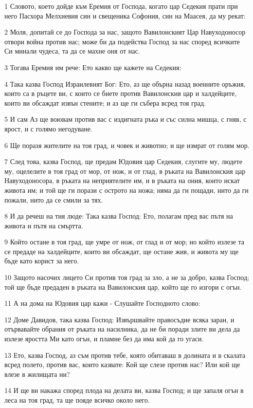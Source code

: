 \par 1 Словото, което дойде към Еремия от Господа, когато цар Седекия прати при него Пасхора Мелхиевия син и свещеника Софония, син на Маасея, да му рекат:
\par 2 Моля, допитай се до Господа за нас, защото Вавилонският Цар Навуходоносор отвори война против нас; може би да подейства Господ за нас според всичките Си минали чудеса, та да се махне оня от нас.
\par 3 Тогава Еремия им рече: Ето какво ще кажете на Седекия:
\par 4 Така казва Господ Израилевият Бог: Ето, аз ще обърна назад военните оръжия, които са в ръцете ви, с които се биете против Вавилонския цар и халдейците, които ви обсаждат извън стените; и аз ще ги събера всред тоя град.
\par 5 И сам Аз ще воювам против вас с издигната ръка и със силна мишца, с гняв, с ярост, и с голямо негодуване.
\par 6 Ще поразя жителите на тоя град, и човек и животно; и ще измрат от голям мор.
\par 7 След това, казва Господ, ще предам Юдовия цар Седекия, слугите му, людете му, оцелелите в тоя град от мор, от нож, и от глад, в ръката на Вавилонския цар Навуходоносора, в ръката на неприятелите им, и в ръката на ония, които искат живота им; и той ще ги порази с острото на ножа; няма да ги пощади, нито да ги пожали, нито да се смили за тях.
\par 8 И да речеш на тия люде: Така казва Господ: Ето, полагам пред вас пътя на живота и пътя на смъртта.
\par 9 Който остане в тоя град, ще умре от нож, от глад и от мор; но който излезе та се предаде на халдейците, които ви обсаждат, ще остане жив, и живота му ще бъде като корист за него.
\par 10 Защото насочих лицето Си против тоя град за зло, а не за добро, казва Господ; той ще бъде предаден в ръката на Вавилонския цар, който ще го изгори с огън.
\par 11 А на дома на Юдовия цар кажи - Слушайте Господното слово:
\par 12 Доме Давидов, така казва Господ: Извършвайте правосъдие всяка заран, и отървавайте обрания от ръката на насилника, да не би поради злите ви дела да излезе яростта Ми като огън, и пламне без да има кой да го угаси.
\par 13 Ето, казва Господ, аз съм против тебе, която обитаваш в долината и в скалата всред полето, против вас, които казвате: Кой ще слезе против нас? Или кой ще влезе в жилищата ни?
\par 14 И ще ви накажа според плода на делата ви, казва Господ; и ще запаля огън в леса на тоя град, та ще пояде всичко около него.

